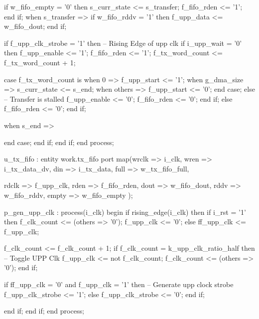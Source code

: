 \begin{VHDLlisting}[tabsize=2]
						if w_fifo_empty = '0' then
							s_curr_state <= s_transfer;
							f_fifo_rden <= '1';
						end if;					
					when s_transfer => 
						if w_fifo_rddv = '1' then
							f_upp_data <= w_fifo_dout;
						end if;
						
						if f_upp_clk_strobe = '1' then
							-- Rising Edge of upp clk
							if i_upp_wait = '0' then
								f_upp_enable <= '1';
								f_fifo_rden <= '1';
								f_tx_word_count <= f_tx_word_count + 1;
							
								case f_tx_word_count is
									when 0 => 
										f_upp_start <= '1';
									when g_dma_size => 
										s_curr_state <= s_end;
									when others =>
										f_upp_start <= '0';
								end case;			
							else
								-- Transfer is stalled
								f_upp_enable <= '0';
								f_fifo_rden <= '0';
							end if;							
						else
							f_fifo_rden <= '0';
						end if;
					
					when s_end => 
				
				end case;
			end if;
		end if;
	end process;
	
	
	u_tx_fifo : entity work.tx_fifo
	port map(wrclk => i_clk, 
			 wren  => i_tx_data_dv,
			 din   => i_tx_data,
			 full  => w_tx_fifo_full,
	
			 rdclk => f_upp_clk,
			 rden  => f_fifo_rden,
			 dout  => w_fifo_dout,
			 rddv  => w_fifo_rddv,
			 empty => w_fifo_empty	
	);
	
	p_gen_upp_clk : process(i_clk)
	begin
		if rising_edge(i_clk) then
			if i_rst = '1' then
				f_clk_count <= (others => '0');
				f_upp_clk <= '0';
			else
				ff_upp_clk <= f_upp_clk;
			
				f_clk_count <= f_clk_count + 1;
				if f_clk_count = k_upp_clk_ratio_half then
					-- Toggle UPP Clk
					f_upp_clk <= not f_clk_count;
					f_clk_count <= (others => '0');
				end if;
				
				if ff_upp_clk = '0' and f_upp_clk = '1' then
					-- Generate upp clock strobe
					f_upp_clk_strobe <= '1';
				else
					f_upp_clk_strobe <= '0';
				end if;
				
			end if;
		end if;	
	end process;
\end{VHDLlisting}


